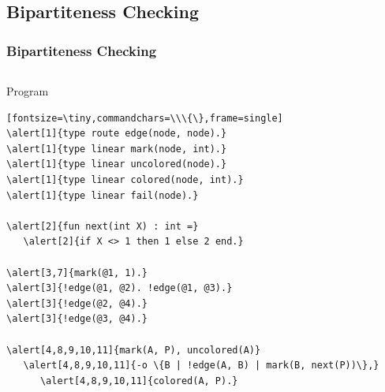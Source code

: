\documentclass{beamer}
\let\oldalert\alert
\renewcommand{\alert}[2][]{%
  \if\relax\detokenize{#1}\relax%
    \oldalert{#2}%
  \else
    \oldalert<#1>{#2}%
  \fi}
\begin{document}
\subsection{Bipartiteness Checking}

\begin{frame}[fragile]
  \frametitle{Bipartiteness Checking}
  \begin{columns}[t]
     \begin{block}{Program}
       \begin{verbatim}[fontsize=\tiny,commandchars=\\\{\},frame=single]
\alert[1]{type route edge(node, node).}
\alert[1]{type linear mark(node, int).}
\alert[1]{type linear uncolored(node).}
\alert[1]{type linear colored(node, int).}
\alert[1]{type linear fail(node).}

\alert[2]{fun next(int X) : int =}
   \alert[2]{if X <> 1 then 1 else 2 end.}

\alert[3,7]{mark(@1, 1).}
\alert[3]{!edge(@1, @2). !edge(@1, @3).}
\alert[3]{!edge(@2, @4).}
\alert[3]{!edge(@3, @4).}

\alert[4,8,9,10,11]{mark(A, P), uncolored(A)}
   \alert[4,8,9,10,11]{-o \{B | !edge(A, B) | mark(B, next(P))\},}
      \alert[4,8,9,10,11]{colored(A, P).}


\end{verbatim}
\end{block}
\end{columns}
\end{frame}
\end{document}
